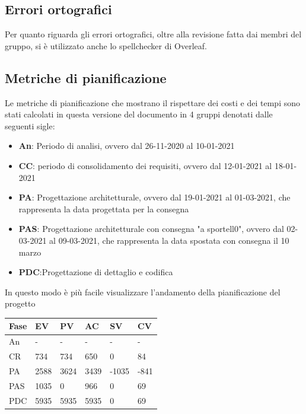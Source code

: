 \subsection{Errori ortografici}

Per quanto riguarda gli errori ortografici, oltre alla revisione fatta dai membri del gruppo, si è utilizzato anche lo spellchecker di Overleaf.
\newpage

\subsection{Metriche di pianificazione}
Le metriche di pianificazione che mostrano il rispettare dei costi e dei tempi sono stati calcolati in questa versione del documento in 4 gruppi denotati dalle seguenti sigle:
\begin{itemize}
    \item \textbf{An}: Periodo di analisi, ovvero dal 26-11-2020 al 10-01-2021
    \item \textbf{CC}: periodo di consolidamento dei requisiti, ovvero dal 12-01-2021 al 18-01-2021
    \item \textbf{PA}: Progettazione architetturale, ovvero dal 19-01-2021 al 01-03-2021, che rappresenta la data progettata per la consegna
    \item \textbf{PAS}: Progettazione architetturale con consegna "a sportell0", ovvero dal 02-03-2021 al 09-03-2021, che rappresenta la data spostata con consegna il 10 marzo
    \item \textbf{PDC}:Progettazione di dettaglio e codifica
\end{itemize}
In questo modo è più facile visualizzare l'andamento della pianificazione del progetto

\begin{longtabu} to \textwidth {| X[0.1,c m] | X[0.1,c m]| X[0.1,c m]| X[0.1,c m]| X[0.1,c m]| X[0.1,c m] |}
    \hline
    \textbf{Fase} &
    \textbf{EV} &
    \textbf{PV} &
    \textbf{AC} &
    \textbf{SV} &
    \textbf{CV} \\
    \hline
    An & - & - & - & - & -  \\ 
    \hline
    CR & 734 & 734 & 650 & 0 & 84 \\
    \hline
    PA & 2588 & 3624 & 3439 & -1035 & -841\\
    \hline
    PAS & 1035 & 0 & 966 & 0 & 69 \\
    \hline
    PDC & 5935 & 5935 & 5935 & 0 & 69 \\
    \hline 
    \end{longtabu}

